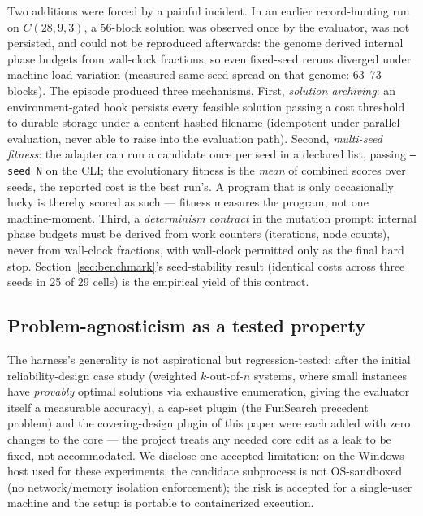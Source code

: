 Two additions were forced by a painful incident. In an earlier
record-hunting run on $C(28,9,3)$, a 56-block solution was observed
once by the evaluator, was not persisted, and could not be reproduced
afterwards: the genome derived internal phase budgets from wall-clock
fractions, so even fixed-seed reruns diverged under machine-load
variation (measured same-seed spread on that genome: 63--73 blocks).
The episode produced three mechanisms. First, \emph{solution
archiving}: an environment-gated hook persists every feasible
solution passing a cost threshold to durable storage under a
content-hashed filename (idempotent under parallel evaluation, never
able to raise into the evaluation path). Second, \emph{multi-seed
fitness}: the adapter can run a candidate once per seed in a declared
list, passing \texttt{--seed N} on the CLI; the evolutionary fitness
is the \emph{mean} of combined scores over seeds, the reported cost
is the best run's. A program that is only occasionally lucky is
thereby scored as such --- fitness measures the program, not one
machine-moment. Third, a \emph{determinism contract} in the mutation
prompt: internal phase budgets must be derived from work counters
(iterations, node counts), never from wall-clock fractions, with
wall-clock permitted only as the final hard stop.
Section~\ref{sec:benchmark}'s seed-stability result (identical costs
across three seeds in 25 of 29 cells) is the empirical yield of this
contract.

\subsection{Problem-agnosticism as a tested property}

The harness's generality is not aspirational but regression-tested:
after the initial reliability-design case study (weighted
$k$-out-of-$n$ systems, where small instances have \emph{provably}
optimal solutions via exhaustive enumeration, giving the evaluator
itself a measurable accuracy), a cap-set plugin (the FunSearch
precedent problem) and the covering-design plugin of this paper were
each added with zero changes to the core --- the project treats any
needed core edit as a leak to be fixed, not accommodated. We disclose
one accepted limitation: on the Windows host used for these
experiments, the candidate subprocess is not OS-sandboxed (no
network/memory isolation enforcement); the risk is accepted for a
single-user machine and the setup is portable to containerized
execution.
